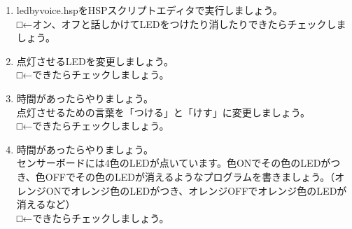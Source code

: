 \begin{tcolorbox}[title=\useOmetoi]
\begin{enumerate}
\item ledbyvoice.hspをHSPスクリプトエディタで実行しましょう。\\□←オン、オフと話しかけてLEDをつけたり消したりできたらチェックしましょう。
\item 点灯させるLEDを変更しましょう。\\□←できたらチェックしましょう。
\item 時間があったらやりましょう。\\点灯させるための言葉を「つける」と「けす」に変更しましょう。\\□←できたらチェックしましょう。
\item 時間があったらやりましょう。\\センサーボードには4色のLEDが点いています。色ONでその色のLEDがつき、色OFFでその色のLEDが消えるようなプログラムを書きましょう。（オレンジONでオレンジ色のLEDがつき、オレンジOFFでオレンジ色のLEDが消えるなど）\\□←できたらチェックしましょう。
\end{enumerate}
\end{tcolorbox}